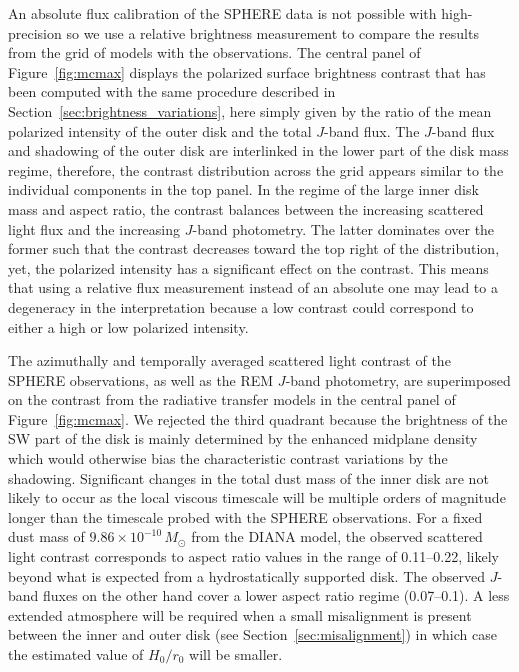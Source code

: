 \documentclass[twocolumn,tighten]{aastex61}
\begin{document}
An absolute flux calibration of the SPHERE data is not possible with high-precision so we use a relative brightness measurement to compare the results from the grid of models with the observations. The central panel of Figure~\ref{fig:mcmax} displays the polarized surface brightness contrast that has been computed with the same procedure described in Section~\ref{sec:brightness_variations}, here simply given by the ratio of the mean polarized intensity of the outer disk and the total $J$-band flux. The $J$-band flux and shadowing of the outer disk are interlinked in the lower part of the disk mass regime, therefore, the contrast distribution across the grid appears similar to the individual components in the top panel. In the regime of the large inner disk mass and aspect ratio, the contrast balances between the increasing scattered light flux and the increasing $J$-band photometry. The latter dominates over the former such that the contrast decreases toward the top right of the distribution, yet, the polarized intensity has a significant effect on the contrast. This means that using a relative flux measurement instead of an absolute one may lead to a degeneracy in the interpretation because a low contrast could correspond to either a high or low polarized intensity.

The azimuthally and temporally averaged scattered light contrast of the SPHERE observations, as well as the REM $J$-band photometry, are superimposed on the contrast from the radiative transfer models in the central panel of Figure~\ref{fig:mcmax}. We rejected the third quadrant because the brightness of the SW part of the disk is mainly determined by the enhanced midplane density which would otherwise bias the characteristic contrast variations by the shadowing. Significant changes in the total dust mass of the inner disk are not likely to occur as the local viscous timescale will be multiple orders of magnitude longer than the timescale probed with the SPHERE observations. For a fixed dust mass of $9.86 \times 10^{-10}$\,$M_\odot$ from the DIANA model, the observed scattered light contrast corresponds to aspect ratio values in the range of 0.11--0.22, likely beyond what is expected from a hydrostatically supported disk. The observed $J$-band fluxes on the other hand cover a lower aspect ratio regime (0.07--0.1). A less extended atmosphere will be required when a small misalignment is present between the inner and outer disk (see Section~\ref{sec:misalignment}) in which case the estimated value of $H_0/r_0$ will be smaller.
\end{document}
